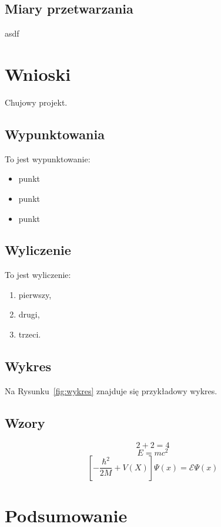 \documentclass{article}
\begin{document}
\subsection{Miary przetwarzania}
asdf

\section{Wnioski}
Chujowy projekt.

\subsection{Wypunktowania}
To jest wypunktowanie:
\begin{itemize}
\item punkt
\item punkt
\item punkt
\end{itemize}
\subsection{Wyliczenie}
To jest wyliczenie:
\begin{enumerate}
\item pierwszy,
\item drugi,
\item trzeci.
\end{enumerate}
\subsection{Wykres}
Na Rysunku~\ref{fig:wykres} znajduje się przykładowy wykres.
\subsection{Wzory}
\begin{equation}
2 + 2 = 4
\end{equation}
\begin{equation}
E = mc^2
\end{equation}
\begin{equation}
\left[- \frac{\hbar^2}{2M} + V(X) \right] \Psi(x)=  \mathcal{E} \Psi(x)
\end{equation}

\section{Podsumowanie}
\end{document}
